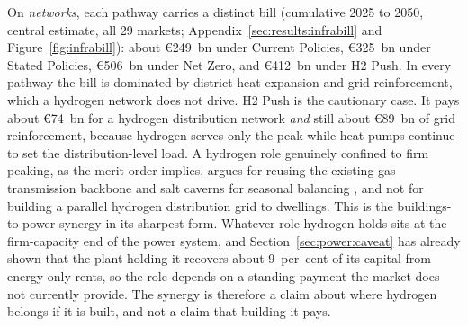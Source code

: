 On \emph{networks}, each pathway carries a distinct bill (cumulative 2025 to 2050,
central estimate, all 29 markets; Appendix~\ref{sec:results:infrabill} and
Figure~\ref{fig:infrabill}): about \euro{}249~bn under Current Policies, \euro{}325~bn under Stated
Policies, \euro{}506~bn under Net Zero, and \euro{}412~bn under H2 Push. In every pathway the
bill is dominated by district-heat expansion and grid reinforcement, which a hydrogen network does not drive. H2 Push is the cautionary case. It pays about \euro{}74~bn for a hydrogen
distribution network \emph{and} still about \euro{}89~bn of grid reinforcement, because
hydrogen
serves only the peak while heat pumps continue to set the distribution-level load. A hydrogen role
genuinely confined to firm peaking, as the merit order implies, argues for reusing the existing gas
transmission backbone and salt caverns for seasonal balancing \citep{GasForClimate2020backbone,Caglayan2020caverns}, and not for building a parallel hydrogen distribution
grid to dwellings. This is the buildings-to-power synergy in its sharpest form. Whatever role hydrogen holds sits at the firm-capacity end of the power system, and Section~\ref{sec:power:caveat} has already shown that the plant holding it recovers about 9~per~cent of its capital from energy-only rents, so the role depends on a standing payment the market does not currently provide. The synergy is therefore a claim about where hydrogen belongs if it is built, and not a claim that building it pays.
